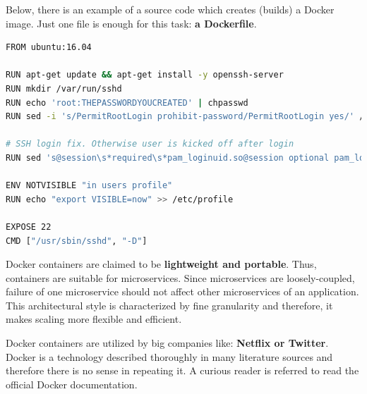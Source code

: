 Below, there is an example of a source code which creates (builds) a Docker image. Just one file is enough for this task: \textbf{a Dockerfile}.

\begin{lstlisting}[basicstyle=\tiny,caption={A Dockerfile to build a Docker image with SSH server installed. Based on Docker official documentation\cite{online-docker-doc-bi}},captionpos=b,language=Bash,xleftmargin=1cm]
FROM ubuntu:16.04

RUN apt-get update && apt-get install -y openssh-server
RUN mkdir /var/run/sshd
RUN echo 'root:THEPASSWORDYOUCREATED' | chpasswd
RUN sed -i 's/PermitRootLogin prohibit-password/PermitRootLogin yes/' /etc/ssh/sshd_config

# SSH login fix. Otherwise user is kicked off after login
RUN sed 's@session\s*required\s*pam_loginuid.so@session optional pam_loginuid.so@g' -i /etc/pam.d/sshd

ENV NOTVISIBLE "in users profile"
RUN echo "export VISIBLE=now" >> /etc/profile

EXPOSE 22
CMD ["/usr/sbin/sshd", "-D"]
\end{lstlisting}

Docker containers are claimed to be \textbf{lightweight and portable}. Thus, containers are suitable for microservices. Since microservices are loosely-coupled, failure of one microservice should not affect other microservices of an application. This architectural style is characterized by fine granularity and therefore, it makes scaling more flexible and efficient\cite{article-k8s-as-avail}.

Docker containers are utilized by big companies like:  \textbf{Netflix or Twitter}\cite{article-nonf-twitter-netflix}. Docker is a technology described thoroughly in many literature sources and therefore there is no sense in repeating it. A curious reader is referred to read the official Docker documentation\cite{online-docker-doc}.
